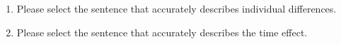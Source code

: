 \begin{enumerate}
	\item Please select the sentence that accurately describes individual differences.
	\item Please select the sentence that accurately describes the time effect.
\end{enumerate}
